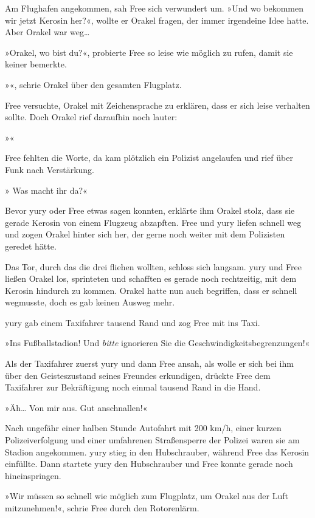 Am Flughafen angekommen, sah Free sich verwundert um. »Und wo bekommen wir jetzt Kerosin her?«, wollte er Orakel fragen, der immer irgendeine Idee hatte. Aber Orakel war weg…

»Orakel, wo bist du?«, probierte Free so leise wie möglich zu rufen, damit sie keiner bemerkte.

»«, schrie Orakel über den gesamten Flugplatz.

Free versuchte, Orakel mit Zeichensprache zu erklären, dass er sich leise verhalten sollte. Doch Orakel rief daraufhin noch lauter:

»«

Free fehlten die Worte, da kam plötzlich ein Polizist angelaufen und rief über Funk nach Verstärkung.

» Was macht ihr da?«

Bevor yury oder Free etwas sagen konnten, erklärte ihm Orakel stolz, dass sie gerade Kerosin von einem Flugzeug abzapften. Free und yury liefen schnell weg und zogen Orakel hinter sich her, der gerne noch weiter mit dem Polizisten geredet hätte.

Das Tor, durch das die drei fliehen wollten, schloss sich langsam. yury und Free ließen Orakel los, sprinteten und schafften es gerade noch rechtzeitig, mit dem Kerosin hindurch zu kommen. Orakel hatte nun auch begriffen, dass er schnell wegmusste, doch es gab keinen Ausweg mehr.

yury gab einem Taxifahrer tausend Rand und zog Free mit ins Taxi.

»Ins Fußballstadion! Und \emph{bitte} ignorieren Sie die Geschwindigkeitsbegrenzungen!«

Als der Taxifahrer zuerst yury und dann Free ansah, als wolle er sich bei ihm über den Geisteszustand seines Freundes erkundigen, drückte Free dem Taxifahrer zur Bekräftigung noch einmal tausend Rand in die Hand.

»Äh… Von mir aus. Gut anschnallen!«

Nach ungefähr einer halben Stunde Autofahrt mit 200 km/h, einer kurzen Polizeiverfolgung und einer umfahrenen Straßensperre der Polizei waren sie am Stadion angekommen. yury stieg in den Hubschrauber, während Free das Kerosin einfüllte. Dann startete yury den Hubschrauber und Free konnte gerade noch hineinspringen.

»Wir müssen so schnell wie möglich zum Flugplatz, um Orakel aus der Luft mitzunehmen!«, schrie Free durch den Rotorenlärm.

